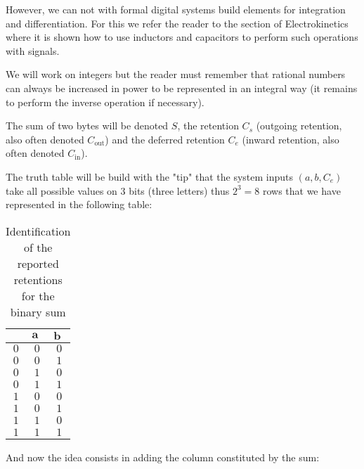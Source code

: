 	However, we can not with formal digital systems build elements for integration and differentiation. For this we refer the reader to the section of Electrokinetics where it is shown how to use inductors and capacitors to perform such operations with signals.

	\begin{tcolorbox}[title=Remark,colframe=black,arc=10pt]
	We will work on integers but the reader must remember that rational numbers can always be increased in power to be represented in an integral way (it remains to perform the inverse operation if necessary).
	\end{tcolorbox}
	The sum of two bytes will be denoted $S$, the retention $C_s$ (outgoing retention, also often denoted $C_\text{out}$) and the deferred retention $C_e$ (inward retention, also often denoted $C_\text{in}$).

	The truth table will be build with the "tip" that the system inputs $(a,b,C_e)$ take all possible values on $3$ bits (three letters) thus $2^3=8$ rows that we have represented in the following table:
	\begin{table}[H]
		\centering
		\begin{tabular}{|c|c|c|}
		\hline
		\rowcolor[HTML]{9B9B9B} 
		\multicolumn{1}{|l|}{\cellcolor[HTML]{9B9B9B}$\pmb{C_e}$} & \multicolumn{1}{l|}{\cellcolor[HTML]{9B9B9B}$\pmb{a}$} & \multicolumn{1}{l|}{\cellcolor[HTML]{9B9B9B}$\pmb{b}$} \\ \hline
		$0$ & $0$ & $0$ \\ \hline
		$0$ & $0$ & $1$ \\ \hline
		$0$ & $1$ & $0$ \\ \hline
		$0$ & $1$ & $1$ \\ \hline
		$1$ & $0$ & $0$ \\ \hline
		$1$ & $0$ & $1$ \\ \hline
		$1$ & $1$ & $0$ \\ \hline
		$1$ & $1$ & $1$ \\ \hline
		\end{tabular}
		\caption{Identification of the reported retentions for the binary sum}
	\end{table}
	And now the idea consists in adding the column constituted by the sum:
	
